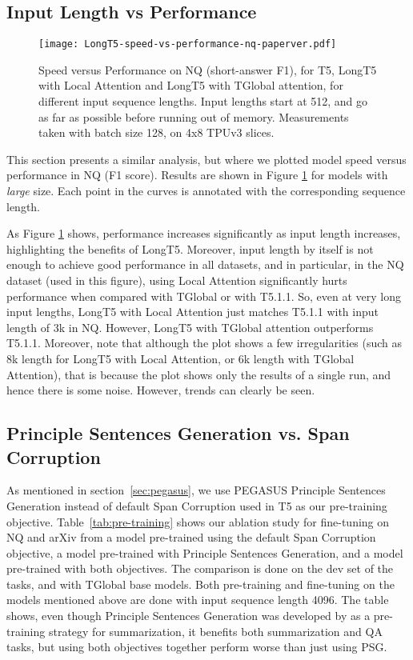 \documentclass[11pt]{article}
\begin{document}
\subsection{Input Length vs Performance} \label{subsec:analysis:performance}




\begin{figure}[t!]
	\texttt{[image: LongT5-speed-vs-performance-nq-paperver.pdf]}
	\centering
	\caption{Speed versus Performance on NQ (short-answer F1), for  T5, LongT5 with Local Attention and LongT5 with TGlobal attention, for different input sequence lengths. Input lengths start at 512, and go as far as possible before running out of memory. Measurements taken with batch size 128, on 4x8 TPUv3 slices.}
	\label{fig:nq-performance}
\end{figure}


This section presents a similar analysis, but where we plotted model speed versus performance in NQ (F1 score). Results are shown in Figure \ref{fig:nq-performance} for models with {\em large} size. Each point in the curves is annotated with the corresponding sequence length. 

As Figure \ref{fig:nq-performance} shows, performance increases significantly as input length increases, highlighting the benefits of LongT5. Moreover, input length by itself is not enough to achieve good performance in all datasets, and in particular, in the NQ dataset (used in this figure), using Local Attention significantly hurts performance when compared with TGlobal or with T5.1.1. So, even at very long input lengths, LongT5 with Local Attention just matches T5.1.1 with input length of 3k in NQ. However, LongT5 with TGlobal attention outperforms T5.1.1. Moreover, note that although the plot shows a few irregularities (such as 8k length for LongT5 with Local Attention, or 6k length with TGlobal Attention), that is because the plot shows only the results of a single run, and hence there is some noise. However, trends can clearly be seen.




\subsection{Principle Sentences Generation vs. Span Corruption} \label{subsec:analysis:pegasus_vs_span}
As mentioned in section~\ref{sec:pegasus}, we use PEGASUS Principle Sentences Generation instead of default Span Corruption used in T5 as our pre-training objective.
Table~\ref{tab:pre-training} shows our ablation study for fine-tuning on NQ and arXiv from a model pre-trained using the default Span Corruption objective, a model pre-trained with Principle Sentences Generation, and a model pre-trained with both objectives. The comparison is done on the dev set of the tasks, and with TGlobal base models. Both pre-training and fine-tuning on the models mentioned above are done with input sequence length 4096. The table shows, even though Principle Sentences Generation was developed by \citet{pegasus} as a pre-training strategy for summarization, it benefits both summarization and QA tasks, but using both objectives together perform worse than just using PSG.
\end{document}
